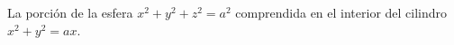 \item La porción de la esfera $x^2 + y^2 + z^2 = a^2$ comprendida en el interior del cilindro $x^2 + y^2 = ax$.
